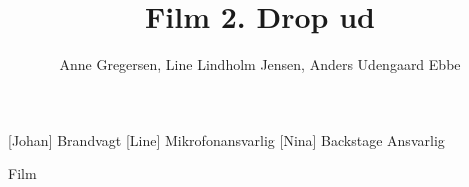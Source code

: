 \documentclass[a4paper,11pt]{article}
\title{Film 2. Drop ud}
\author{Anne Gregersen, Line Lindholm Jensen, Anders Udengaard Ebbe }
\begin{document}
\maketitle

\begin{roles}
[Johan] Brandvagt
[Line] Mikrofonansvarlig
[Nina] Backstage Ansvarlig
\end{roles}

\begin{song}
Film
\end{song}
\end{document}
